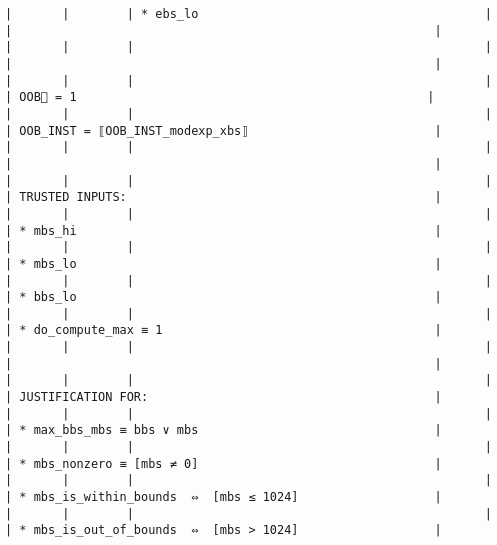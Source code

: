 \documentclass[varwidth=\maxdimen,margin=0.5cm,multi={verbatim}]{standalone}
\begin{document}
\begin{verbatim}
|       |        | * ebs_lo                                        |                                          |                                                           |
|       |        |                                                 |                                          |                                                           |
|       |        |                                                 |                                          | OOB🏴 = 1                                                 |
|       |        |                                                 |                                          | OOB_INST = ⟦OOB_INST_modexp_xbs⟧                          |
|       |        |                                                 |                                          |                                                           |
|       |        |                                                 |                                          | TRUSTED INPUTS:                                           |
|       |        |                                                 |                                          | * mbs_hi                                                  |
|       |        |                                                 |                                          | * mbs_lo                                                  |
|       |        |                                                 |                                          | * bbs_lo                                                  |
|       |        |                                                 |                                          | * do_compute_max ≡ 1                                      |
|       |        |                                                 |                                          |                                                           |
|       |        |                                                 |                                          | JUSTIFICATION FOR:                                        |
|       |        |                                                 |                                          | * max_bbs_mbs ≡ bbs ∨ mbs                                 |
|       |        |                                                 |                                          | * mbs_nonzero ≡ [mbs ≠ 0]                                 |
|       |        |                                                 |                                          | * mbs_is_within_bounds  ⇔  [mbs ≤ 1024]                   |
|       |        |                                                 |                                          | * mbs_is_out_of_bounds  ⇔  [mbs > 1024]                   |

\end{verbatim}
\end{document}
